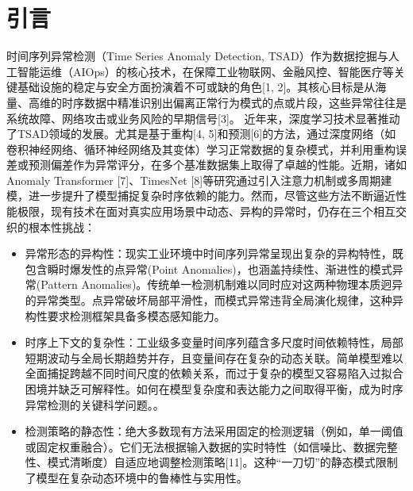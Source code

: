 \documentclass{setp-new}
\begin{document}




\maketitle
\section{引言}
时间序列异常检测（Time Series Anomaly Detection, TSAD）作为数据挖掘与人工智能运维（AIOps）的核心技术，在保障工业物联网、金融风控、智能医疗等关键基础设施的稳定与安全方面扮演着不可或缺的角色[1, 2]。其核心目标是从海量、高维的时序数据中精准识别出偏离正常行为模式的点或片段，这些异常往往是系统故障、网络攻击或业务风险的早期信号[3]。
近年来，深度学习技术显著推动了TSAD领域的发展。尤其是基于重构[4, 5]和预测[6]的方法，通过深度网络（如卷积神经网络、循环神经网络及其变体）学习正常数据的复杂模式，并利用重构误差或预测偏差作为异常评分，在多个基准数据集上取得了卓越的性能。近期，诸如Anomaly Transformer [7]、TimesNet [8]等研究通过引入注意力机制或多周期建模，进一步提升了模型捕捉复杂时序依赖的能力。然而，尽管这些方法不断逼近性能极限，现有技术在面对真实应用场景中动态、异构的异常时，仍存在三个相互交织的根本性挑战：

\begin{itemize}
    \item 异常形态的异构性：现实工业环境中时间序列异常呈现出复杂的异构特性，既包含瞬时爆发性的点异常(Point Anomalies)，也涵盖持续性、渐进性的模式异常(Pattern Anomalies)。传统单一检测机制难以同时应对这两种物理本质迥异的异常类型。点异常破坏局部平滑性，而模式异常违背全局演化规律，这种异构性要求检测框架具备多模态感知能力。

    \item 时序上下文的复杂性：工业级多变量时间序列蕴含多尺度时间依赖特性，局部短期波动与全局长期趋势并存，且变量间存在复杂的动态关联。简单模型难以全面捕捉跨越不同时间尺度的依赖关系，而过于复杂的模型又容易陷入过拟合困境并缺乏可解释性。如何在模型复杂度和表达能力之间取得平衡，成为时序异常检测的关键科学问题。。
    
    \item 检测策略的静态性：绝大多数现有方法采用固定的检测逻辑（例如，单一阈值或固定权重融合）。它们无法根据输入数据的实时特性（如信噪比、数据完整性、模式清晰度）自适应地调整检测策略[11]。这种“一刀切”的静态模式限制了模型在复杂动态环境中的鲁棒性与实用性。
\end{itemize}
\end{document}
